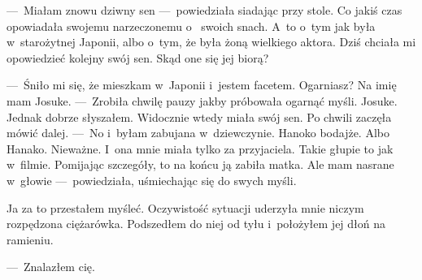 ---~Miałam znowu dziwny sen ---~powiedziała siadając przy stole. Co jakiś czas opowiadała swojemu narzeczonemu o~
swoich snach. A~to o~tym jak była w~starożytnej Japonii, albo o~tym, że była żoną wielkiego aktora. Dziś chciała mi 
opowiedzieć kolejny swój sen. Skąd one się jej biorą? 

---~Śniło mi się, że mieszkam w~Japonii i~jestem facetem. Ogarniasz? Na imię mam Josuke. ---~Zrobiła chwilę pauzy 
jakby próbowała ogarnąć myśli. Josuke. Jednak dobrze słyszałem. Widocznie wtedy miała swój sen. Po chwili zaczęła 
mówić dalej. ---~No i~byłam zabujana w~dziewczynie. Hanoko bodajże. Albo Hanako. Nieważne. I~ona mnie miała tylko za 
przyjaciela. Takie głupie to jak w~filmie. Pomijając szczegóły, to na końcu ją zabiła matka. Ale mam nasrane w~głowie 
---~powiedziała, uśmiechając się do swych myśli.

Ja za to przestałem myśleć. Oczywistość sytuacji uderzyła mnie niczym rozpędzona ciężarówka. Podszedłem do niej od 
tyłu i~położyłem jej dłoń na ramieniu.

---~Znalazłem cię.
